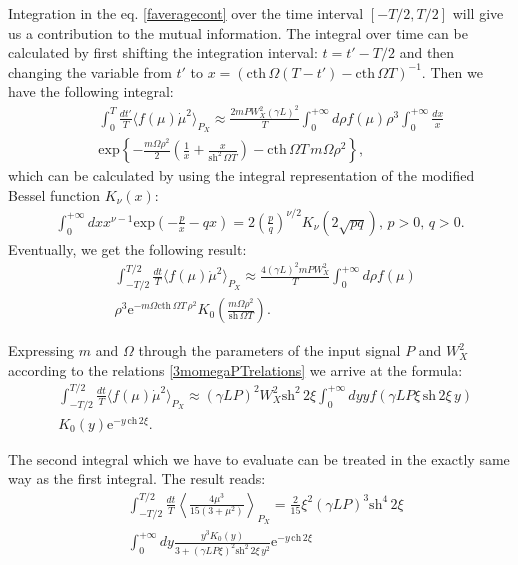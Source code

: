 \documentclass{article}
\begin{document}
Integration in the eq$.$ \eqref{faveragecont} over the time interval $[-T/2,T/2]$ will give us a contribution to the mutual information. The integral over time can be calculated by first shifting the integration interval: $t = t' - T/2$ and then changing the variable from $t'$ to $x = \left(\textrm{cth}\,\Omega(T-t')-\textrm{cth}\,\Omega T\right)^{-1}$. Then we have the following integral: 
\begin{eqnarray}
    &&\int_{0}^{T} \frac{dt'}{T}\langle f(\mu)\dot{\mu}^{2} \rangle_{P_{X}} \approx \frac{2mPW_{X}^{2}(\gamma L)^{2}}{T} \int_{0}^{+\infty} d\rho f(\mu)\rho^{3}\int_{0}^{+\infty}\frac{dx}{x}\\ \nonumber
    &&\textrm{exp}\left\{-\frac{m\Omega\rho^{2}}{2}\left(\frac{1}{x}+\frac{x}{\textrm{sh}^{2}\,\Omega T}\right)-\textrm{cth}\,\Omega T\,m\Omega\rho^{2}\right\},
\end{eqnarray}
which can be calculated by using the integral representation of the modified Bessel function $K_{\nu}(x)$:
\begin{eqnarray}
    \int_{0}^{+\infty}dx x^{\nu-1}\textrm{exp}\left(-\frac{p}{x}-q x\right) = 2\left(\frac{p}{q}\right)^{\nu/2} K_{\nu}(2\sqrt{pq}), \, p>0, \, q>0.
\end{eqnarray}
Eventually, we get the following result:
\begin{align}
    &\int_{-T/2}^{T/2} \frac{dt}{T}\langle f(\mu)\dot{\mu}^{2} \rangle_{P_{X}} \approx \frac{4(\gamma L)^{2}m P W_{X}^{2}}{T}\int_{0}^{+\infty} d\rho f(\mu)\nonumber\\
    &\rho^{3}\textrm{e}^{-m\Omega\textrm{cth}\,\Omega T\,\rho^{2}}K_{0}\left(\frac{m\Omega\rho^{2}}{\textrm{sh}\,\Omega T}\right).
\end{align}

Expressing $m$ and $\Omega$ through the parameters of the input signal $P$ and $W_{X}^{2}$ according to the relations \eqref{3momegaPTrelations} we arrive at the formula:
\begin{align}
    &\int_{-T/2}^{T/2} \frac{dt}{T}\langle f(\mu)\dot{\mu}^{2} \rangle_{P_{X}} \approx (\gamma L P )^{2} W_{X}^{2}\textrm{sh}^{2}\, 2\xi\int_{0}^{+\infty}dy y f\left(\gamma L P\xi\, \textrm{sh}\,2\xi \,y\right)\\ \nonumber
    &K_{0}\left(y\right)\textrm{e}^{-y\, \textrm{ch}\,2\xi}.
\end{align}

The second integral which we have to evaluate can be treated in the exactly same way as the first integral. The result reads: 
\begin{align}
    &\int_{-T/2}^{T/2} \frac{dt}{T}\left\langle \frac{4 \mu^{3}}{15(3+\mu^{2})} \right\rangle_{P_{X}} = \frac{2}{15}\xi^{2}(\gamma L P)^{3}\textrm{sh}^{4}\,2\xi\nonumber\\
    &\int_{0}^{+\infty}dy \frac{y^{3}K_{0}\left(y\right)}{3+(\gamma L P\xi)^{2}\textrm{sh}^{2}\,2\xi \,y^{2}}\textrm{e}^{-y\,\textrm{ch}\,2\xi}
\end{align}





\end{document}
